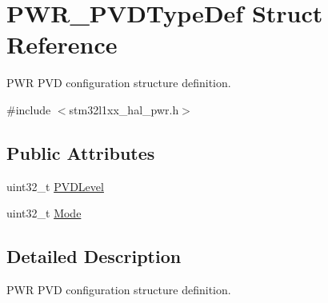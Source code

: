 \hypertarget{struct_p_w_r___p_v_d_type_def}{\section{P\-W\-R\-\_\-\-P\-V\-D\-Type\-Def Struct Reference}
\label{struct_p_w_r___p_v_d_type_def}
}


P\-W\-R P\-V\-D configuration structure definition.  




{\ttfamily \#include $<$stm32l1xx\-\_\-hal\-\_\-pwr.\-h$>$}

\subsection*{Public Attributes}
\begin{DoxyCompactItemize}
\item 
uint32\-\_\-t \hyperlink{struct_p_w_r___p_v_d_type_def_a540471bc6ac947fd8bc2c87f61d9faab}{P\-V\-D\-Level}
\item 
uint32\-\_\-t \hyperlink{struct_p_w_r___p_v_d_type_def_af692d691f0cb5871b319fd371fab34d8}{Mode}
\end{DoxyCompactItemize}


\subsection{Detailed Description}
P\-W\-R P\-V\-D configuration structure definition. 

